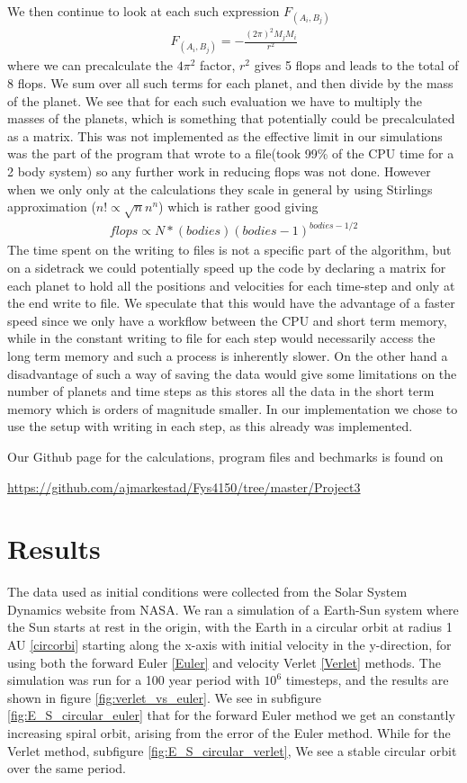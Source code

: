 \documentclass[a4paper,11pt]{article}
\begin{document}
{\begin{align}
\end{align}
We then continue to look at each such expression $F_{(A_i,B_j)}$
\begin{align}
F_{(A_i,B_j)}= -\frac{(2\pi)^2 M_j M_i}{r^2}
\end{align}
where we can precalculate the $4\pi^2$ factor, $r^2$ gives 5 flops and leads to the total of 8 flops. We sum over all such terms for each planet, and then divide by the mass of the planet. We see that for each such evaluation we have to multiply the masses of the planets, which is something that potentially could be precalculated as a matrix. This was not implemented as the effective limit in our simulations was the part of the program that wrote to a file(took 99\% of the CPU time for a 2 body system) so any further work in reducing flops was not done. However when we only only at the calculations they scale in general by using Stirlings approximation ($n! \propto \sqrt{n}n^n$) which is rather good giving
\begin{align}
	flops \propto N * (bodies)(bodies-1)^{bodies-1/2}
\end{align}
The time spent on the writing to files is not a specific part of the algorithm, but on a sidetrack we could potentially speed up the code by declaring a matrix for each planet to hold all the positions and velocities for each time-step and only at the end write to file. We speculate that this would have the advantage of a faster speed since we only have a workflow between the CPU and short term memory, while in the constant writing to file for each step would necessarily access the long term memory and such a process is inherently slower. On the other hand a disadvantage of such a way of saving the data would give some limitations on the number of planets and time steps as this stores all the data in the short term memory which is orders of magnitude smaller. In our implementation we chose to use the setup with writing in each step, as this already was implemented. 

Our Github page for the calculations, program files and bechmarks is found on 

\url{https://github.com/ajmarkestad/Fys4150/tree/master/Project3}


\section*{Results}
The data used as initial conditions were collected from the Solar System Dynamics website from NASA\cite{NASA}. We ran a simulation of a Earth-Sun system where the Sun starts at rest in the origin, with the Earth in a circular orbit at radius 1 AU \ref{circorbi} starting along the x-axis with initial velocity in the y-direction, for using both the forward Euler \ref{Euler} and velocity Verlet \ref{Verlet} methods. The simulation was run for a 100 year period with $10^{6}$ timesteps, and the results are shown in figure \ref{fig:verlet_vs_euler}. We see in subfigure \ref{fig:E_S_circular_euler} that for the forward Euler method we get an constantly increasing spiral orbit, arising from the error of the Euler method. While for the Verlet method, subfigure \ref{fig:E_S_circular_verlet}, We see a stable circular orbit over the same period.

}
\end{document}
